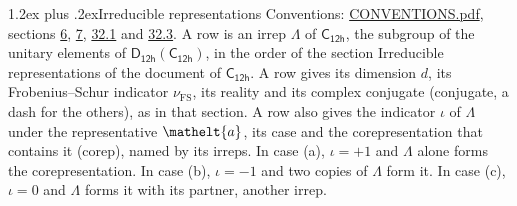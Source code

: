 \documentclass[10pt,a4paper]{article}
\makeatletter
\renewcommand\section{\@startsection{section}{1}{\z@}{-3ex plus -1ex minus -.2ex}%
  {1.2ex plus .2ex}{\normalfont\large\sffamily\bfseries\color{parttitle}}}
\numberwithin{equation}{section}
\newcommand{\eltfont}[1]{{\let\sigma\eltsigma\mathelt{#1}}}
\newcommand{\grp}[1]{\mathsf{#1}}
\newcommand{\elt}[1]{\eltfont{#1}}
\newcommand{\fsind}{\nu_{\mathrm{FS}}}
\makeatother
\begin{document}
\section{Irreducible representations}\label{s:irreps}
Conventions: \href{../../CONVENTIONS.pdf}{CONVENTIONS.pdf}, sections \href{../../../rotation/CONVENTIONS.pdf\#conv.6}{6}, \href{../../../rotation/CONVENTIONS.pdf\#conv.7}{7}, \href{../../CONVENTIONS.pdf\#conv.32.1}{32.1} and \href{../../CONVENTIONS.pdf\#conv.32.3}{32.3}.
\leavevmode\label{n:irrep.Delta}A row is an irrep $\Lambda$ of $\grp{C_{12h}}$, the subgroup of the unitary elements of $\grp{D_{12h}}(\grp{C_{12h}})$, in the order of the section Irreducible representations of the document of \href{../../../rotation/data/pdf/C12h.pdf}{$\grp{C_{12h}}$}. \label{n:index.dimension}\label{n:index.frobenius}\label{n:head.irrep}\label{n:head.reality}\label{n:head.conjugate}A row gives its dimension $d$, its Frobenius--Schur indicator $\fsind$, its reality and its complex conjugate (conjugate, a dash for the others), as in that section. \label{n:head.case.corep}\label{n:head.corep}A row also gives the indicator $\iota$ of $\Lambda$ under the representative $\elt{a}$, its case and the corepresentation that contains it (corep), named by its irreps. In case (a), $\iota = +1$ and $\Lambda$ alone forms the corepresentation. In case (b), $\iota = -1$ and two copies of $\Lambda$ form it. In case (c), $\iota = 0$ and $\Lambda$ forms it with its partner, another irrep.
\setlength{\emergencystretch}{2em}\par\setlength{\emergencystretch}{0pt}
\end{document}
